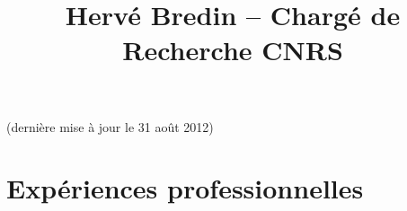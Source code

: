 \documentclass{simplecv}
\begin{document}
\pagestyle{empty} 



\title{Herv\'{e} Bredin -- Charg\'{e} de Recherche CNRS}

\maketitle

\vspace{-.5cm}
\begin{center}
(derni\`{e}re mise \`{a} jour le 31 ao\^ut 2012)
\end{center}

\section{Exp\'{e}riences professionnelles}
\end{document}
